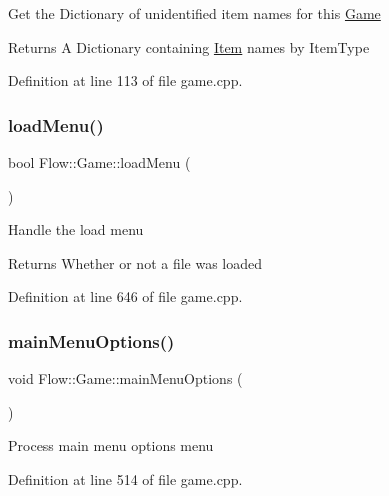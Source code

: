 Get the Dictionary of unidentified item names for this \hyperlink{class_flow_1_1_game}{Game} \begin{DoxyReturn}{Returns}
A Dictionary containing \hyperlink{class_flow_1_1_item}{Item} names by Item\+Type 
\end{DoxyReturn}


Definition at line 113 of file game.\+cpp.

\hypertarget{class_flow_1_1_game_a685c4a00d30acbd2e17ce4244a18f595}{}\label{class_flow_1_1_game_a685c4a00d30acbd2e17ce4244a18f595} 
\subsubsection{\texorpdfstring{load\+Menu()}{loadMenu()}}
{\footnotesize\ttfamily bool Flow\+::\+Game\+::load\+Menu (\begin{DoxyParamCaption}{ }\end{DoxyParamCaption})}

Handle the load menu \begin{DoxyReturn}{Returns}
Whether or not a file was loaded 
\end{DoxyReturn}


Definition at line 646 of file game.\+cpp.

\hypertarget{class_flow_1_1_game_a25c2d490f362ad2b0d4df53eee48602d}{}\label{class_flow_1_1_game_a25c2d490f362ad2b0d4df53eee48602d} 
\subsubsection{\texorpdfstring{main\+Menu\+Options()}{mainMenuOptions()}}
{\footnotesize\ttfamily void Flow\+::\+Game\+::main\+Menu\+Options (\begin{DoxyParamCaption}{ }\end{DoxyParamCaption})}

Process main menu options menu 

Definition at line 514 of file game.\+cpp.

\hypertarget{class_flow_1_1_game_a4adcdf9a6c23065c19af4fae3a0a731f}{}\label{class_flow_1_1_game_a4adcdf9a6c23065c19af4fae3a0a731f} 
